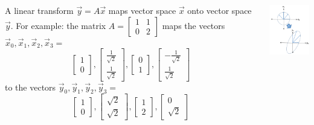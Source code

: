 \documentclass{beamer}
\begin{document}
\begin{frame}
  \begin{columns}[t]
    \column{2.75in}
    \begin{block}{}
      A linear transform $\vec{y}=A\vec{x}$ maps vector space $\vec{x}$
      onto vector space $\vec{y}$.  For example: the matrix
      $A=\left[\begin{array}{cc}1 & 1\\0&2\end{array}\right]$
      maps the vectors $\vec{x}_0,\vec{x}_1,\vec{x}_2,\vec{x}_3=$
      \[
      \left[\begin{array}{c}1\\0\end{array}\right],
      \left[\begin{array}{c}\frac{1}{\sqrt{2}}\\\frac{1}{\sqrt{2}}\end{array}\right],
      \left[\begin{array}{c}0\\1\end{array}\right],
      \left[\begin{array}{c}-\frac{1}{\sqrt{2}}\\\frac{1}{\sqrt{2}}\end{array}\right]
      \]
      to the vectors
      $\vec{y}_0,\vec{y}_1,\vec{y}_2,\vec{y}_3=$
      \[
      \left[\begin{array}{c}1\\0\end{array}\right],
      \left[\begin{array}{c}\sqrt{2}\\\sqrt{2}\end{array}\right],
      \left[\begin{array}{c}1\\2\end{array}\right],
      \left[\begin{array}{c}0\\\sqrt{2}\end{array}\right]
      \]
    \end{block}
    \column{1.5in}
    \begin{block}{}
      \includegraphics[width=1.45in]{linalg_review_fig1.png}
    \end{block}
  \end{columns}
\end{frame}
\end{document}
